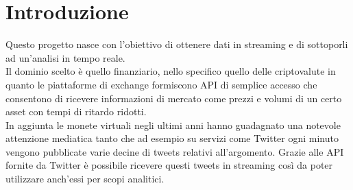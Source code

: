 \section{Introduzione}

Questo progetto nasce con l'obiettivo di ottenere dati in streaming e di sottoporli ad un'analisi
in tempo reale.\\
Il dominio scelto è quello finanziario, nello specifico quello delle criptovalute in quanto le piattaforme di exchange formiscono API di semplice accesso che consentono di ricevere informazioni di mercato come prezzi e volumi di un certo asset con tempi di ritardo ridotti.\\
In aggiunta le monete virtuali negli ultimi anni hanno guadagnato una notevole attenzione mediatica tanto che ad esempio su servizi come Twitter ogni minuto vengono pubblicate varie decine di tweets relativi all'argomento. Grazie alle API fornite da Twitter è possibile ricevere questi tweets in streaming così da poter utilizzare anch'essi per scopi analitici.